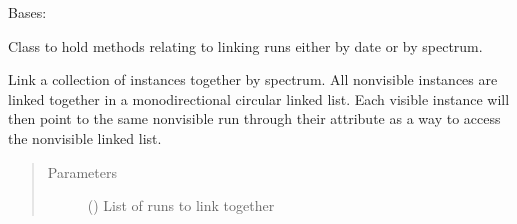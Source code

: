 \documentclass[letterpaper,10pt,english]{sphinxmanual}
\begin{document}
\begin{fulllineitems}
\label{\detokenize{polo.utils:polo.utils.io_utils.RunLinker}}
Bases: 

Class to hold methods relating to linking runs either by
date or by spectrum.

\begin{fulllineitems}
\label{\detokenize{polo.utils:polo.utils.io_utils.RunLinker.link_runs_by_date}}
\end{fulllineitems}


\begin{fulllineitems}
\label{\detokenize{polo.utils:polo.utils.io_utils.RunLinker.link_runs_by_spectrum}}
Link a collection of {\hyperref[\detokenize{polo.crystallography:polo.crystallography.run.HWIRun}]{}} instances
together by spectrum. All non\sphinxhyphen{}visible
{\hyperref[\detokenize{polo.crystallography:polo.crystallography.run.HWIRun}]{}} instances
are linked together in a monodirectional circular linked list.
Each visible {\hyperref[\detokenize{polo.crystallography:polo.crystallography.run.HWIRun}]{}} instance
will then point to the same non\sphinxhyphen{}visible run through
their 
attribute as a way to access the non\sphinxhyphen{}visible
linked list.
\begin{quote}\begin{description}
\item[{Parameters}] \leavevmode
{} () \textendash{} List of runs to link together


\end{description}
\end{quote}
\end{fulllineitems}
\end{fulllineitems}
\end{document}
